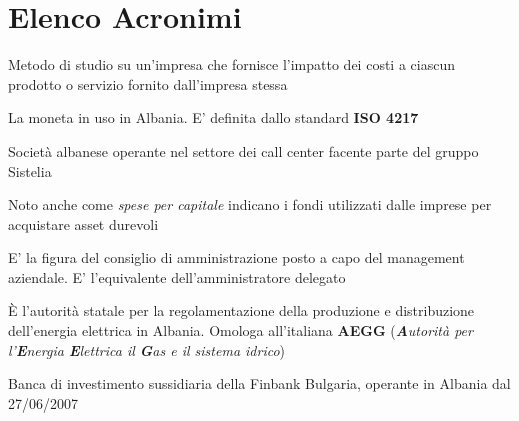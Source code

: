 \section*{Elenco Acronimi}
\begin{acronym}
\begin{multicols}{2}
		   {\newline \small Metodo di studio su un'impresa che fornisce l'impatto dei costi a ciascun prodotto o servizio fornito dall'impresa stessa \par}


		   {\newline \small La moneta in uso in Albania. E' definita dallo standard \textbf{ISO 4217}  \par}

		   {\newline \small Società albanese operante nel settore dei call center facente parte del gruppo Sistelia \par}

		   {\newline \small Noto anche come \textit{spese per capitale} indicano i fondi utilizzati dalle imprese per acquistare asset durevoli  \par}

		   {\newline \small E' la figura del consiglio di amministrazione posto a capo del management aziendale. E' l'equivalente dell'amministratore delegato  \par}

		   {\newline \small \`E l'autorità statale per la regolamentazione della produzione e distribuzione dell'energia elettrica in Albania\cite{ere_albania}. Omologa all'italiana \textbf{AEGG} (\textit{\textbf{A}utorità per l'\textbf{E}nergia \textbf{E}lettrica il \textbf{G}as e il sistema idrico})\cite{aeeg_ita} \par}

		   {\newline \small Banca di investimento sussidiaria della Finbank Bulgaria, operante in Albania dal 27/06/2007\cite{finbank_al} \par}


\end{multicols}
\end{acronym}
